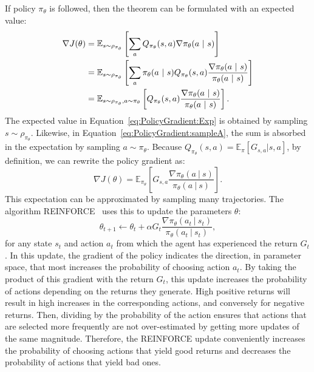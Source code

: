 If policy $\pi_{\theta}$ is followed, then the theorem can be formulated with an expected value:
\begin{align}
    \nabla J(\theta)&=\mathbb{E}_{s\sim\rho_{\pi_{\theta}}}\left[\sum_aQ_{\pi_{\theta}}(s,a)\nabla\pi_\theta(a\ |\ s)\right]\label{eq:PolicyGradient:Exp}\\
    &=\mathbb{E}_{s\sim\rho_{\pi_{\theta}}}\left[\sum_a\pi_\theta(a\ |\ s)Q_{\pi_{\theta}}(s,a)\frac{\nabla\pi_\theta(a\ |\ s)}{\pi_\theta(a\ |\ s)}\right]\notag\\
    &=\mathbb{E}_{s\sim\rho_{\pi_{\theta}},a\sim\pi_{\theta}}\left[Q_{\pi_{\theta}}(s,a)\frac{\nabla\pi_\theta(a\ |\ s)}{\pi_\theta(a\ |\ s)}\right].\label{eq:PolicyGradient:sampleA}
\end{align}
The expected value in Equation~\ref{eq:PolicyGradient:Exp} is obtained by sampling $s\sim\rho_{\pi_{\theta}}$. Likewise, in Equation~\ref{eq:PolicyGradient:sampleA}, the sum is absorbed in the expectation by sampling $a\sim\pi_{\theta}$. Because $Q_{\pi_\theta}(s,a)=\mathbb{E}_\pi[G_{s,a}|s,a]$, by definition, we can rewrite the policy gradient as:
\begin{equation}
    \nabla J(\theta)=\mathbb{E}_{\pi_{\theta}}\left[G_{s,a}\frac{\nabla\pi_\theta(a\ |\ s)}{\pi_\theta(a\ |\ s)}\right].
    \label{eq:REINFORCE}
\end{equation}
This expectation can be approximated by sampling many trajectories. The algorithm REINFORCE~\citep{Williams1992_Reinforce} uses this to update the parameters $\theta$:
\begin{equation}
    \theta_{t+1}\leftarrow\theta_t+\alpha G_t\frac{\nabla\pi_\theta(a_t\ |\ s_t)}{\pi_\theta(a_t\ |\ s_t)},
\end{equation}
for any state $s_t$ and action $a_t$ from which the agent has experienced the return $G_t$. In this update, the gradient of the policy indicates the direction, in parameter space, that most increases the probability of choosing action $a_t$. By taking the product of this gradient with the return $G_t$, this update increases the probability of actions depending on the returns they generate. High positive returns will result in high increases in the corresponding actions, and conversely for negative returns. Then, dividing by the probability of the action ensures that actions that are selected more frequently are not over-estimated by getting more updates of the same magnitude. Therefore, the REINFORCE update conveniently increases the probability of choosing actions that yield good returns and decreases the probability of actions that yield bad ones. 

